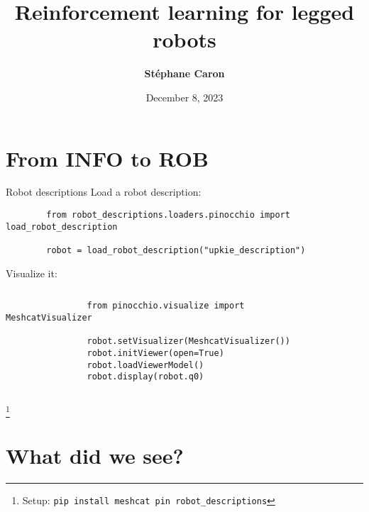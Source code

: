 \documentclass[9pt, aspectratio=43]{beamer}
\title{
    Reinforcement learning for legged robots
}
\author{\textbf{St\'ephane Caron}}
\date{December 8, 2023}
\institute{Inria}
\newcommand\blfootnote[1]{%
  \begingroup
  \renewcommand\thefootnote{}%
  \footnote{#1}%
  \addtocounter{footnote}{-1}%
  \endgroup
}
\begin{document}
\maketitle


\section*{From INFO to ROB}


\begin{frame}[fragile]{Robot descriptions}
    Load a robot description:
    \begin{verbatim}
        from robot_descriptions.loaders.pinocchio import load_robot_description

        robot = load_robot_description("upkie_description")
    \end{verbatim}
    Visualize it:
    \begin{columns}
        \begin{column}{0.75\columnwidth}
            \begin{verbatim}
                from pinocchio.visualize import MeshcatVisualizer

                robot.setVisualizer(MeshcatVisualizer())
                robot.initViewer(open=True)
                robot.loadViewerModel()
                robot.display(robot.q0)
            \end{verbatim}
        \end{column}
        \begin{column}{0.24\columnwidth}
            \begin{figure}
                \centering
            \end{figure}
        \end{column}
    \end{columns}
    \blfootnote{
        Setup: \texttt{pip install meshcat pin robot_descriptions}
    }
\end{frame}

\section*{What did we see?}
\end{document}
